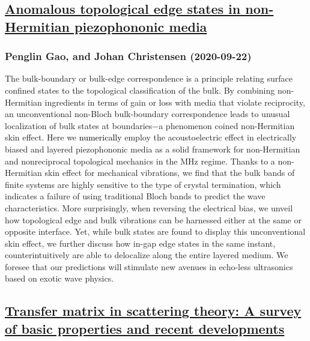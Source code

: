 {\subsection*{\href{http://arxiv.org/abs/2009.10508v1}{Anomalous topological edge states in non-Hermitian piezophononic media}}
\subsubsection*{Penglin Gao, and Johan Christensen (2020-09-22)}
The bulk-boundary or bulk-edge correspondence is a principle relating surface
confined states to the topological classification of the bulk. By combining
non-Hermitian ingredients in terms of gain or loss with media that violate
reciprocity, an unconventional non-Bloch bulk-boundary correspondence leads to
unusual localization of bulk states at boundaries$-$a phenomenon coined
non-Hermitian skin effect. Here we \textcolor{black}{numerically} employ the
acoustoelectric effect in electrically biased and layered piezophononic media
as a solid framework for non-Hermitian and nonreciprocal topological mechanics
in the MHz regime. Thanks to a non-Hermitian skin effect for mechanical
vibrations, we find that the bulk bands of finite systems are highly sensitive
to the type of crystal termination, which indicates a failure of using
traditional Bloch bands to predict the wave characteristics. More surprisingly,
when reversing the electrical bias, we unveil how topological edge and bulk
vibrations can be harnessed either at the same or opposite interface. Yet,
while bulk states are found to display this unconventional skin effect, we
further discuss how in-gap edge states in the same instant, counterintuitively
are able to delocalize along the entire layered medium. We foresee that our
predictions will stimulate new avenues in echo-less ultrasonics based on exotic
wave physics.

\subsection*{\href{http://arxiv.org/abs/2009.10507v1}{Transfer matrix in scattering theory: A survey of basic properties and  recent developments}}
}
